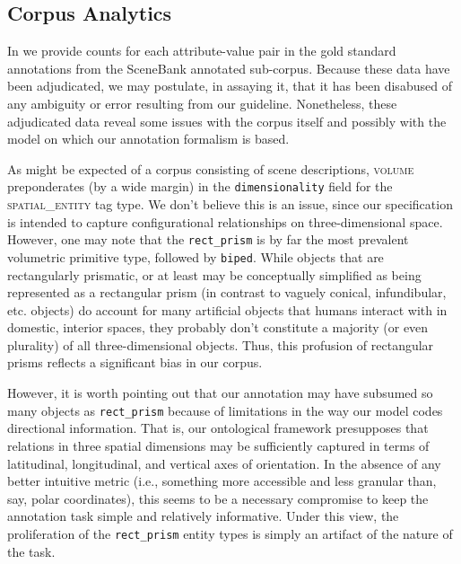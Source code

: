 \documentclass[11pt]{article}
\begin{document}
\subsection{Corpus Analytics} %
\label{sub:corpus_analytics}
In  we provide counts for each attribute-value pair in the gold standard annotations from the SceneBank annotated sub-corpus. Because these data have been adjudicated, we may postulate, in assaying it, that it has been disabused of any ambiguity or error resulting from our guideline. Nonetheless, these adjudicated data reveal some issues with the corpus itself and possibly with the model on which our annotation formalism is based.

As might be expected of a corpus consisting of scene descriptions, \textsc{volume} preponderates (by a wide margin) in the \texttt{dimensionality} field for the \textsc{spatial\_entity} tag type. We don't believe this is an issue, since our specification is intended to capture configurational relationships on three-dimensional space. However, one may note that the \texttt{rect\_prism} is by far the most prevalent volumetric primitive type, followed by \texttt{biped}. While objects that are rectangularly prismatic, or at least may be conceptually simplified as being represented as a rectangular prism (in contrast to vaguely conical, infundibular, etc. objects) do account for many artificial objects that humans interact with in domestic, interior spaces, they probably don't constitute a majority (or even plurality) of all three-dimensional objects. Thus, this profusion of rectangular prisms reflects a significant bias in our corpus.

However, it is worth pointing out that our annotation may have subsumed so many objects as \texttt{rect\_prism} because of limitations in the way our model codes directional information. That is, our ontological framework presupposes that relations in three spatial dimensions may be sufficiently captured in terms of latitudinal, longitudinal, and vertical axes of orientation. In the absence of any better intuitive metric (i.e., something more accessible and less granular than, say, polar coordinates), this seems to be a necessary compromise to keep the annotation task simple and relatively informative. Under this view, the proliferation of the \texttt{rect\_prism} entity types is simply an artifact of the nature of the task.
\end{document}

